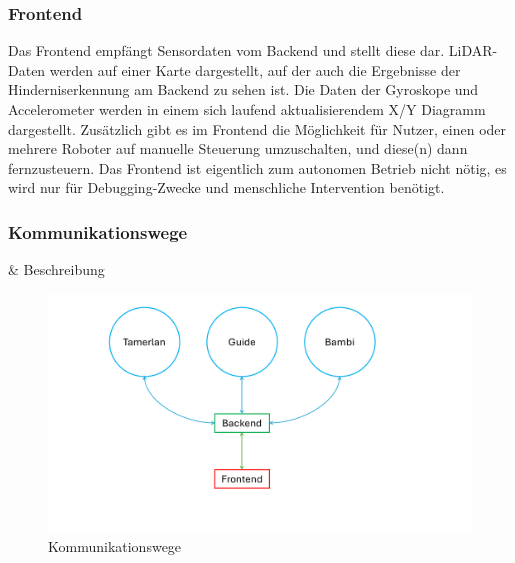 \subsubsection{Frontend}
Das Frontend empfängt Sensordaten vom Backend und stellt diese dar.
%
LiDAR-Daten werden auf einer Karte dargestellt,
auf der auch die Ergebnisse der Hinderniserkennung am Backend zu sehen ist.
%
Die Daten der Gyroskope und Accelerometer werden in einem sich laufend aktualisierendem X/Y Diagramm dargestellt.
%
Zusätzlich gibt es im Frontend die Möglichkeit für Nutzer,
einen oder mehrere Roboter auf manuelle Steuerung umzuschalten,
und diese(n) dann fernzusteuern.
%
Das Frontend ist eigentlich zum autonomen Betrieb nicht nötig,
es wird nur für Debugging-Zwecke und menschliche Intervention benötigt.

\subsubsection{Kommunikationswege}
\label{subsec:ueberblick_comms}
\& Beschreibung
\begin{figure}[H]
    \centering
        \includegraphics[width=\textwidth, center]{img/Kommunikationswege.png}  
    \caption{Kommunikationswege}
    \label{fig:kommunikationswege}
\end{figure}

